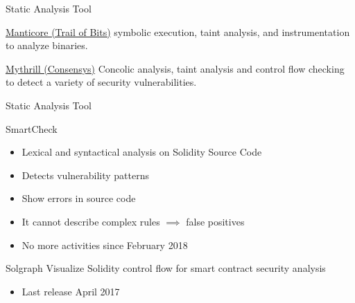 \begin{frame}{Static Analysis Tool}
    \begin{block}{\href{https://github.com/trailofbits/manticore.git}{Manticore (Trail of Bits)}}
        symbolic execution, taint analysis, and instrumentation to analyze binaries.
    \end{block}

    \begin{block}{\href{https://github.com/ConsenSys/mythril}{Mythrill (Consensys)}}
        Concolic analysis, taint analysis and control flow checking to detect a variety of security vulnerabilities.
    \end{block}


\end{frame}

\begin{frame}{Static Analysis Tool}

    \begin{block}{SmartCheck~\cite{bib:smartcheck}}
        \begin{itemize}
            \item Lexical and syntactical analysis on Solidity Source Code
            \item Detects vulnerability patterns 
            \item Show errors in source code
            \item It cannot describe complex rules $\implies$ false positives
            \item No more activities since February 2018
        \end{itemize}
    \end{block}


    \begin{block}{Solgraph}
        Visualize Solidity control flow for smart contract security analysis
        \begin{itemize}
            \item Last release April 2017
        \end{itemize}
    \end{block}
    
\end{frame}

